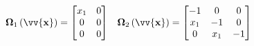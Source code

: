 \documentclass{beamer}
\newcommand*{\Round}[1]{\left(#1\right)}
\newcommand*{\Bold}[1]{\boldsymbol{\mathbf{#1}}}
\newcommand*{\Matr}[1]{\Bold{#1}}
\newcommand*{\Vect}[1]{\vv{\Bold{#1}}}
\begin{document}
\begin{frame}
\begin{itemize}
\begin{align}
      \Matr{\Omega}_1\Round{\Vect{x}}
      &= \begin{bmatrix}
        x_1 & 0 \\
        0   & 0 \\
        0   & 0 \\
      \end{bmatrix}
      &
      \Matr{\Omega}_2\Round{\Vect{x}}
      &= \begin{bmatrix}
        -1  & 0   & 0  \\
        x_1 & -1  & 0  \\
        0   & x_1 & -1 \\
      \end{bmatrix}
    \end{align}
  \end{itemize}
\end{frame}
\end{document}
